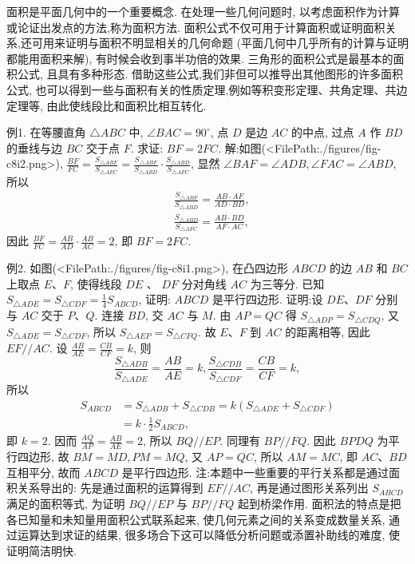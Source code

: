 
面积是平面几何中的一个重要概念.
在处理一些几何问题时, 以考虑面积作为计算或论证出发点的方法,称为面积方法.
面积公式不仅可用于计算面积或证明面积关系,还可用来证明与面积不明显相关的几何命题 (平面几何中几乎所有的计算与证明都能用面积来解), 有时候会收到事半功倍的效果.
三角形的面积公式是最基本的面积公式, 且具有多种形态.
借助这些公式,我们非但可以推导出其他图形的许多面积公式, 也可以得到一些与面积有关的性质定理,例如等积变形定理、共角定理、共边定理等, 由此使线段比和面积比相互转化.



例1. 在等腰直角 $\triangle A B C$ 中, $\angle B A C=90^{\circ}$, 点 $D$ 是边 $A C$ 的中点, 过点 $A$ 作 $B D$ 的垂线与边 $B C$ 交于点 $F$. 求证: $B F=2 F C$.
解:如图(<FilePath:./figures/fig-c8i2.png>), $\frac{B F}{F C}=\frac{S_{\triangle A B F}}{S_{\triangle A F C}}=\frac{S_{\triangle A B F}}{S_{\triangle A B D}} \cdot \frac{S_{\triangle A B D}}{S_{\triangle A F C}}$, 显然 $\angle B A F=\angle A D B, \angle F A C=\angle A B D$, 所以
$$
\begin{aligned}
& \frac{S_{\triangle A B F}}{S_{\triangle A B D}}=\frac{A B \cdot A F}{A D \cdot B D}, \\
& \frac{S_{\triangle A B D}}{S_{\triangle A F C}}=\frac{A B \cdot B D}{A F \cdot A C},
\end{aligned}
$$
因此 $\frac{B F}{F C}=\frac{A B}{A D} \cdot \frac{A B}{A C}=2$, 即 $B F=2 F C$.



例2. 如图(<FilePath:./figures/fig-c8i1.png>), 在凸四边形 $A B C D$ 的边 $A B$ 和 $B C$ 上取点 $E 、 F$, 使得线段 $D E$ 、 $D F$ 分对角线 $A C$ 为三等分.
已知 $S_{\triangle A D E}=S_{\triangle C D F}=\frac{1}{4} S_{A B C D}$, 证明: $A B C D$ 是平行四边形.
证明:设 $D E 、 D F$ 分别与 $A C$ 交于 $P 、 Q$. 连接 $B D$, 交 $A C$ 与 $M$.
由 $A P=Q C$ 得 $S_{\triangle A D P}=S_{\triangle C D Q}$, 又 $S_{\triangle A D E}=S_{\triangle C D F}$, 所以 $S_{\triangle A E P}=S_{\triangle C F Q}$. 故 $E 、 F$ 到 $A C$ 的距离相等, 因此 $E F / / A C$.
设 $\frac{A B}{A E}=\frac{C B}{C F}=k$, 则
$$
\frac{S_{\triangle A D B}}{S_{\triangle A D E}}=\frac{A B}{A E}=k, \frac{S_{\triangle C D B}}{S_{\triangle C D F}}=\frac{C B}{C F}=k,
$$
所以
$$
\begin{aligned}
S_{A B C D} & =S_{\triangle A D B}+S_{\triangle C D B}=k\left(S_{\triangle A D E}+S_{\triangle C D F}\right) \\
& =k \cdot \frac{1}{2} S_{A B C D},
\end{aligned}
$$
即 $k=2$. 因而 $\frac{A Q}{A P}=\frac{A B}{A E}=2$, 所以 $B Q / / E P$. 同理有 $B P / / F Q$. 因此 $B P D Q$ 为平行四边形, 故 $B M=M D, P M=M Q$, 又 $A P=Q C$, 所以 $A M=M C$, 即 $A C 、 B D$ 互相平分, 故而 $A B C D$ 是平行四边形.
注:本题中一些重要的平行关系都是通过面积关系导出的: 先是通过面积的运算得到 $E F / / A C$, 再是通过图形关系列出 $S_{A B C D}$ 满足的面积等式, 为证明 $B Q / / E P$ 与 $B P / / F Q$ 起到桥梁作用.
面积法的特点是把各已知量和未知量用面积公式联系起来, 使几何元素之间的关系变成数量关系, 通过运算达到求证的结果, 很多场合下这可以降低分析问题或添置补助线的难度, 使证明简洁明快.



